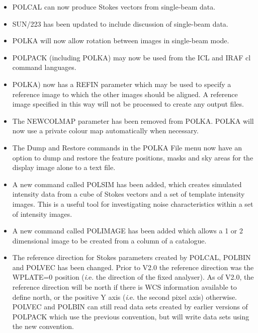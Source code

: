 \documentclass[twoside,11pt]{article}
\newcommand{\htmlref}[2]{#1}
\renewcommand{\_}{\texttt{\symbol{95}}}
\begin{document}
\begin{itemize}

\item \htmlref{POLCAL}{POLCAL} can now produce Stokes vectors from
single-beam data.

\item SUN/223 has been updated to include discussion of single-beam data.

\item \htmlref{POLKA}{POLKA} will now allow rotation between images in
single-beam mode.

\item POLPACK (including \htmlref{POLKA}{POLKA}) may now be used from the
ICL and IRAF cl command languages.

\item \htmlref{POLKA}{POLKA}) now has a REFIN parameter which may be used
to specify a reference image to which the other images should be aligned.
A reference image specified in this way will not be processed to create
any output files.

\item The NEWCOLMAP parameter has been removed from \htmlref{POLKA}{POLKA}.
POLKA will now use a private colour map automatically when necessary.

\item The Dump and Restore commands in the \htmlref{POLKA}{POLKA} File menu
now have an option to dump and restore the feature positions, masks and sky 
areas for the display image alone to a text file.

\item A new command called \htmlref{POLSIM}{POLSIM} has been added, which
creates simulated intensity data from a cube of Stokes vectors and a set
of template intensity images. This is a useful tool for investigating
noise characteristics within a set of intensity images.

\item A new command called \htmlref{POLIMAGE}{POLIMAGE} has been added
which allows a 1 or 2 dimensional image to be created from a column of a 
catalogue. 

\item The reference direction for Stokes parameters created by
\htmlref{POLCAL}{POLCAL}, \htmlref{POLBIN}{POLBIN} and
\htmlref{POLVEC}{POLVEC} has been changed.
Prior to V2.0 the reference direction was the WPLATE=0 position ({\emph
i.e.} the direction of the fixed analyser). As of V2.0, the reference
direction will be north if there is WCS information available to define
north, or the positive Y axis ({\emph i.e.} the second pixel axis)
otherwise. \htmlref{POLVEC}{POLVEC} and \htmlref{POLBIN}{POLBIN} can still read data sets
created by earlier versions of POLPACK which use the previous convention, but will 
write data sets using the new convention.


\end{itemize}
\end{document}
